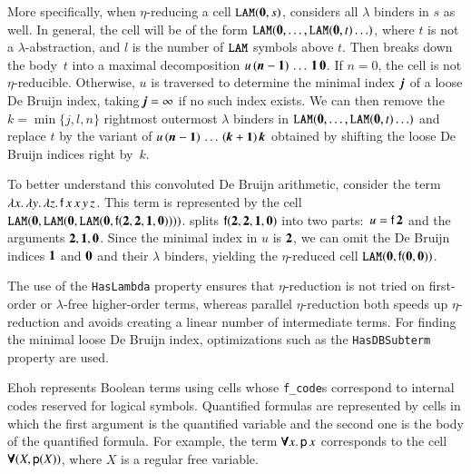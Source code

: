 More specifically, when $\eta$-reducing a cell $\texttt{LAM}(\mathbf{0}, s)$,
\ehohii{} considers all $\lambda$ binders in $s$ as well. In general,
the cell will be of the form
$\texttt{LAM}(\mathbf{0}, \dotsc,\allowbreak \texttt{LAM}(\mathbf{0}, t) \ldots)$,
where $t$ is not a
$\lambda$-abstraction, and $l$ is the number of $\texttt{LAM}$ symbols above $t$. Then \ehohii{} breaks down the body~$t$ into a maximal
decomposition $u\, (\textbf{\textit{n}}\mathbf{{}-1}) \, \ldots \, \mathbf{1} \, \mathbf{0}$.
If $n = 0$, the cell is not $\eta$-reducible.
Otherwise, $u$ is traversed to determine the
minimal index~$\textbf{\textit{j}}$ of a loose De Bruijn index,
taking $\textbf{\textit{j}} = \infty$ if no such index exists.
We can then remove the $k = \min\{j,l,n\}$ rightmost outermost $\lambda$ binders in $\texttt{LAM}(\mathbf{0},
\ldots, \texttt{LAM}(\mathbf{0}, t) \ldots)$ and replace %
$t$ by the variant of
$u \allowbreak\, (\textbf{\textit{n}}\mathbf{{}-1}) \allowbreak\, \ldots \, (\textbf{\textit{k}}\mathbf{{}+1}) \, \textbf{\textit{k}}$
obtained by shifting the loose De Bruijn indices right by~$k$.

To better understand this convoluted De Bruijn arithmetic, consider the
term $\lambda x. \, \lambda y. \, \lambda z.\,\allowbreak \mathsf{f} \, x \, x \, y
\, z$. This term is represented by the cell $\texttt{LAM}(\mathbf{0},
\texttt{LAM}(\mathbf{0}, \texttt{LAM}(\mathbf{0},\allowbreak \mathsf{f}(\mathbf{2}, \mathbf{2}, \mathbf{1},
\mathbf{0}))))$. \ehohii{} splits $\mathsf{f}(\mathbf{2}, \mathbf{2}, \mathbf{1}, \mathbf{0})$ into
two parts:\ $u = \mathsf{f} \, \mathbf{2}$ and the arguments $\mathbf{2}, \mathbf{1},
\mathbf{0}$. Since the minimal index in $u$ is $\mathbf{2}$, we can
omit the De Bruijn indices $\mathbf{1}$ and $\mathbf{0}$ and their $\lambda$ binders,
yielding the $\eta$-reduced cell $\texttt{LAM}(\mathbf{0}, \mathsf{f}(\mathbf{0},
\mathbf{0}))$.

The use of the \texttt{HasLambda} property ensures that $\eta$-reduction is not
tried on first-order or $\lambda$-free higher-order terms, whereas parallel
$\eta$-reduction both speeds up $\eta$-reduction and avoids creating a linear
number of intermediate terms. For finding the minimal loose De Bruijn index,
optimizations such as the \texttt{HasDBSub\-term} property are used.

Ehoh represents Boolean terms using
cells whose \texttt{f\_code}s correspond to internal codes reserved
for logical symbols. Quantified formulas are represented by cells in which the
first argument is the quantified variable and the second one is the body of the
quantified formula. For example, the term $\pmb{\forall} x.\, \mathsf{p} \, x$ corresponds
to the cell $\pmb{\forall}(X, \mathsf{p}(X))$, where $X$ is a regular free variable.

